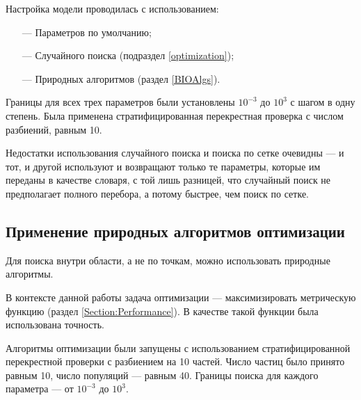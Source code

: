 Настройка модели проводилась с использованием:

\begin{itemize}
    \item[—] Параметров по умолчанию;
    \item[—] Случайного поиска (подраздел \ref{optimization});
    \item[—] Природных алгоритмов (раздел \ref{BIOAlgs}).
\end{itemize}

Границы для всех трех параметров были установлены $10^{-3}$ до $10^3$ с шагом в одну степень.
Была применена стратифицированная перекрестная проверка с числом разбиений, равным 10.

Недостатки использования случайного поиска и поиска по сетке очевидны — и тот, и другой используют и возвращают только те
параметры, которые им переданы в качестве словаря, с той лишь разницей, что случайный поиск не предполагает полного перебора,
а потому быстрее, чем поиск по сетке.

\subsection{Применение природных алгоритмов оптимизации}

Для поиска внутри области, а не по точкам, можно использовать природные алгоритмы.

В контексте данной работы задача оптимизации — максимизировать метрическую функцию (раздел \ref{Section:Performance}).
В качестве такой функции была использована точность.

Алгоритмы оптимизации были запущены с использованием стратифицированной перекрестной проверки с разбиением на 10 частей.
Число частиц было принято равным 10, число популяций — равным 40.
Границы поиска для каждого параметра — от $10^{-3}$ до $10^3$.

